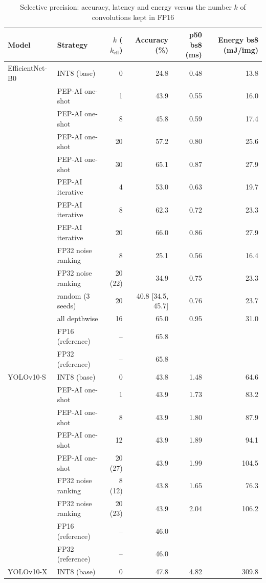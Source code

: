 \begin{table}[htbp]
\footnotesize\setlength{\tabcolsep}{2.5pt}
\caption{Selective precision: accuracy, latency and energy versus the number $k$ of convolutions kept in FP16}\label{tab:selective}
\begin{tabular}{@{}llrrrr@{}}
\toprule
Model & Strategy & $k$ ($k_\text{eff}$) & Accuracy (\%) & p50 bs8 (ms) & Energy bs8 (mJ/img) \\
\midrule
EfficientNet-B0 & INT8 (base) & 0 & 24.8 & 0.48 & 13.8 \\
 & PEP-AI one-shot & 1 & 43.9 & 0.55 & 16.0 \\
 & PEP-AI one-shot & 8 & 45.8 & 0.59 & 17.4 \\
 & PEP-AI one-shot & 20 & 57.2 & 0.80 & 25.6 \\
 & PEP-AI one-shot & 30 & 65.1 & 0.87 & 27.9 \\
 & PEP-AI iterative & 4 & 53.0 & 0.63 & 19.7 \\
 & PEP-AI iterative & 8 & 62.3 & 0.72 & 23.3 \\
 & PEP-AI iterative & 20 & 66.0 & 0.86 & 27.9 \\
 & FP32 noise ranking & 8 & 25.1 & 0.56 & 16.4 \\
 & FP32 noise ranking & 20 (22) & 34.9 & 0.75 & 23.3 \\
 & random (3 seeds) & 20 & 40.8 [34.5, 45.7] & 0.76 & 23.7 \\
 & all depthwise & 16 & 65.0 & 0.95 & 31.0 \\
 & FP16 (reference) & -- & 65.8 & & \\
 & FP32 (reference) & -- & 65.8 & & \\
\midrule
YOLOv10-S & INT8 (base) & 0 & 43.8 & 1.48 & 64.6 \\
 & PEP-AI one-shot & 1 & 43.9 & 1.73 & 83.2 \\
 & PEP-AI one-shot & 8 & 43.9 & 1.80 & 87.9 \\
 & PEP-AI one-shot & 12 & 43.9 & 1.89 & 94.1 \\
 & PEP-AI one-shot & 20 (27) & 43.9 & 1.99 & 104.5 \\
 & FP32 noise ranking & 8 (12) & 43.8 & 1.65 & 76.3 \\
 & FP32 noise ranking & 20 (23) & 43.9 & 2.04 & 106.2 \\
 & FP16 (reference) & -- & 46.0 & & \\
 & FP32 (reference) & -- & 46.0 & & \\
\midrule
YOLOv10-X & INT8 (base) & 0 & 47.8 & 4.82 & 309.8 \\

\end{tabular}
\end{table}

